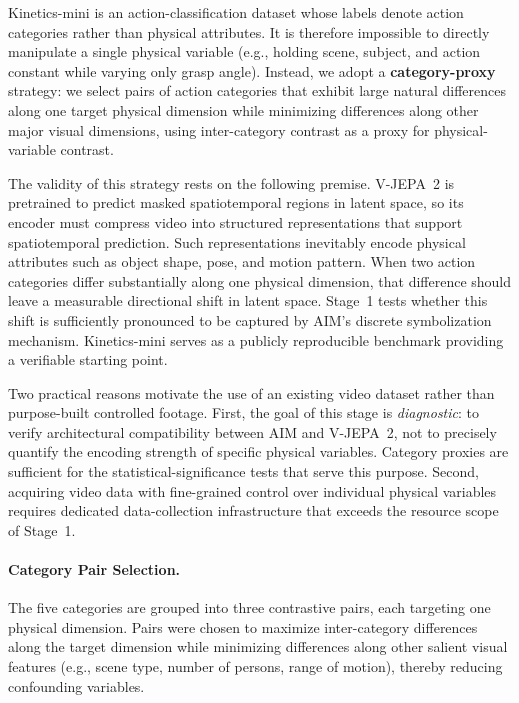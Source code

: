 \documentclass{article}
\begin{document}
Kinetics-mini is an action-classification dataset whose labels denote action
categories rather than physical attributes.  It is therefore impossible to
directly manipulate a single physical variable (e.g., holding scene, subject,
and action constant while varying only grasp angle).  Instead, we adopt a
\textbf{category-proxy} strategy: we select pairs of action categories that
exhibit large natural differences along one target physical dimension while
minimizing differences along other major visual dimensions, using inter-category
contrast as a proxy for physical-variable contrast.

The validity of this strategy rests on the following premise.  V-JEPA~2 is
pretrained to predict masked spatiotemporal regions in latent space, so its
encoder must compress video into structured representations that support
spatiotemporal prediction.  Such representations inevitably encode physical
attributes such as object shape, pose, and motion pattern.  When two action
categories differ substantially along one physical dimension, that difference
should leave a measurable directional shift in latent space.  Stage~1 tests
whether this shift is sufficiently pronounced to be captured by AIM's discrete
symbolization mechanism.  Kinetics-mini serves as a publicly reproducible
benchmark providing a verifiable starting point.

Two practical reasons motivate the use of an existing video dataset rather than
purpose-built controlled footage.  First, the goal of this stage is
\emph{diagnostic}: to verify architectural compatibility between AIM and
V-JEPA~2, not to precisely quantify the encoding strength of specific physical
variables.  Category proxies are sufficient for the statistical-significance
tests that serve this purpose.  Second, acquiring video data with fine-grained
control over individual physical variables requires dedicated data-collection
infrastructure that exceeds the resource scope of Stage~1.

\paragraph{Category Pair Selection.}
The five categories are grouped into three contrastive pairs, each targeting one
physical dimension.  Pairs were chosen to maximize inter-category differences
along the target dimension while minimizing differences along other salient
visual features (e.g., scene type, number of persons, range of motion), thereby
reducing confounding variables.
\end{document}
